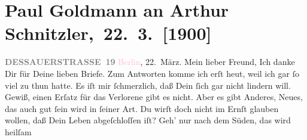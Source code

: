 

         
         \renewcommand{\erwaehntePersonen}{Personen: Richard Beer-Hofmann, Otto Brahm, Auguste Chlum, Marie Glümer, Theodor Herzl, Alfred Kerr,  Leopold Ferdinand Salvator, Fritz Mauthner, Helene Meyer-Cohn, Marie Reinhard, Felix Salten}
         \renewcommand{\erwaehnteOrte}{Orte: Berlin, Wien}
         \renewcommand{\erwaehnteWerke}{Werke: Der Gemeine. Schauspiel in drei Aufzügen, National-Zeitung, Neue Freie Presse, Tagebuch}
               \section[ Paul Goldmann an Arthur Schnitzler, 22. 3. {[}1900{]}]{Paul Goldmann an Arthur Schnitzler, 22. 3. {[}1900{]}}\nopagebreak{}\rehead{ }\normalsize\beginnumbering{} \toendnotes[C]{\smallbreak\pagebreak[2]} 
\toendnotes[C]{\smallbreak}\pstart{}{\pb}\textcolor{gray}{\textbf{DESSAUERSTRASSE 19}}\pend{}{\bigskip}\pstart
           \raggedleft{}\textcolor{pink}{Berlin}{}\ledrightnote{\textcolor{pink}{Berlin}}, 22. März.\pend
           \pstart\center{}Mein lieber Freund,\pend\pstart
           Ich danke Dir für Deine lieben Briefe. Zum Antworten komme ich erſt heut, weil ich gar ſo viel zu thun hatte.\pend
           \pstart
           Es iſt mir ſchmerzlich, daß Dein \label{K_L02907-1v}\label{K_L02907-1h} ſich gar nicht lindern
               will. Gewiß, einen Erſatz für das Verlorene gibt es nicht. Aber es gibt Anderes,
               Neues, das auch gut ſein wird in ſeiner Art. Du wirſt doch nicht im Ernſt glauben
               wollen, daß Dein Leben abgeſchloſſen iſt? Geh’ nur nach dem Süden, das wird heilſam
